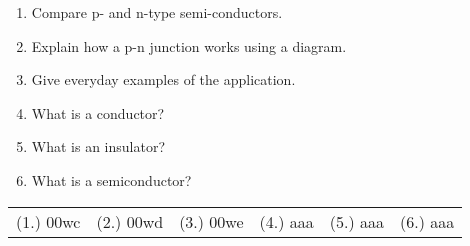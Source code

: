 \begin{eocexercises}{}
\begin{enumerate}
\item Compare p- and n-type semi-conductors.
\item Explain how a p-n junction works using a diagram.
\item Give everyday examples of the application.
\item{What is a conductor?}
\item{What is an insulator?}
\item{What is a semiconductor?}
\end{enumerate}
\practiceinfo

\begin{tabular}[h]{cccccc}
(1.) 00wc & (2.) 00wd & (3.) 00we & (4.) aaa & (5.) aaa & (6.) aaa & 
 \end{tabular}
\end{eocexercises}
